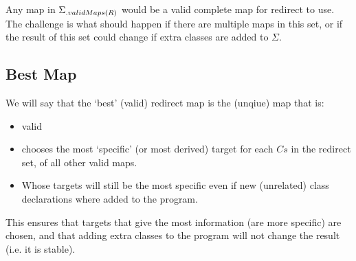 Any map in $\Sigma{\ensuremath{{}_{.{validMaps}({R})}}}$ would be a valid complete map for redirect to use. The challenge is what should happen if there are multiple maps in this set, or if the result of this set could change if extra classes are added to $\Sigma$.

\subsection {Best Map}
We will say that the `best' (valid) redirect map is the (unqiue) map that is:
\begin{itemize}
	\item valid
	\item chooses the most `specific' (or most derived) target for each $Cs$ in the redirect set, of all other valid maps.
	\item Whose targets will still be the most specific even if new (unrelated) class declarations where added to the program. 
\end{itemize}

This ensures that targets that give the most information (are more specific) are chosen, and that adding extra classes to the program will not change the result (i.e. it is stable).


\begin{defs}
	
	
	

{}
	
	
	
	
\end{defs}


